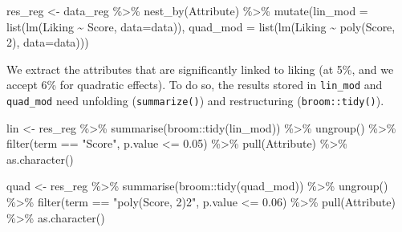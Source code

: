 \documentclass[
]{krantz}
\makeatletter
\newenvironment{Shaded}{\begin{snugshade}}{\end{snugshade}}
\newcommand{\AttributeTok}[1]{\textcolor[rgb]{0.61,0.61,0.61}{#1}}
\newcommand{\DecValTok}[1]{\textcolor[rgb]{0.06,0.06,0.06}{#1}}
\newcommand{\FloatTok}[1]{\textcolor[rgb]{0.06,0.06,0.06}{#1}}
\newcommand{\FunctionTok}[1]{\textcolor[rgb]{0,0,0}{#1}}
\newcommand{\NormalTok}[1]{#1}
\newcommand{\OtherTok}[1]{\textcolor[rgb]{0.37,0.37,0.37}{#1}}
\newcommand{\SpecialCharTok}[1]{\textcolor[rgb]{0,0,0}{#1}}
\newcommand{\StringTok}[1]{\textcolor[rgb]{0.5,0.5,0.5}{#1}}
\newenvironment{kframe}{%
\medskip{}
\setlength{\fboxsep}{.8em}
 \def\at@end@of@kframe{}%
 \ifinner\ifhmode%
  \def\at@end@of@kframe{\end{minipage}}%
  \begin{minipage}{\columnwidth}%
 \fi\fi%
 \def\FrameCommand##1{\hskip\@totalleftmargin \hskip-\fboxsep
 \colorbox{shadecolor}{##1}\hskip-\fboxsep
     \hskip-\linewidth \hskip-\@totalleftmargin \hskip\columnwidth}%
 \MakeFramed {\advance\hsize-\width
   \@totalleftmargin\z@ \linewidth\hsize
   \@setminipage}}%
 {\par\unskip\endMakeFramed%
 \at@end@of@kframe}
\renewenvironment{Shaded}{\begin{kframe}}{\end{kframe}}
\makeatother
\begin{document}
\begin{Shaded}
\begin{Highlighting}[]
\NormalTok{res\_reg }\OtherTok{\textless{}{-}}\NormalTok{ data\_reg }\SpecialCharTok{\%\textgreater{}\%}
  \FunctionTok{nest\_by}\NormalTok{(Attribute) }\SpecialCharTok{\%\textgreater{}\%}
  \FunctionTok{mutate}\NormalTok{(}\AttributeTok{lin\_mod =} \FunctionTok{list}\NormalTok{(}\FunctionTok{lm}\NormalTok{(Liking }\SpecialCharTok{\textasciitilde{}}\NormalTok{ Score, }\AttributeTok{data=}\NormalTok{data)),}
         \AttributeTok{quad\_mod =} \FunctionTok{list}\NormalTok{(}\FunctionTok{lm}\NormalTok{(Liking }\SpecialCharTok{\textasciitilde{}} \FunctionTok{poly}\NormalTok{(Score, }\DecValTok{2}\NormalTok{), }\AttributeTok{data=}\NormalTok{data)))}
\end{Highlighting}
\end{Shaded}

We extract the attributes that are significantly linked to liking (at 5\%, and we accept 6\% for quadratic effects). To do so, the results stored in \texttt{lin\_mod} and \texttt{quad\_mod} need unfolding (\texttt{summarize()}) and restructuring (\texttt{broom::tidy()}).

\begin{Shaded}
\begin{Highlighting}[]
\NormalTok{lin }\OtherTok{\textless{}{-}}\NormalTok{ res\_reg }\SpecialCharTok{\%\textgreater{}\%}
  \FunctionTok{summarise}\NormalTok{(broom}\SpecialCharTok{::}\FunctionTok{tidy}\NormalTok{(lin\_mod)) }\SpecialCharTok{\%\textgreater{}\%}
  \FunctionTok{ungroup}\NormalTok{() }\SpecialCharTok{\%\textgreater{}\%}
  \FunctionTok{filter}\NormalTok{(term }\SpecialCharTok{==} \StringTok{"Score"}\NormalTok{, p.value }\SpecialCharTok{\textless{}=} \FloatTok{0.05}\NormalTok{) }\SpecialCharTok{\%\textgreater{}\%}
  \FunctionTok{pull}\NormalTok{(Attribute) }\SpecialCharTok{\%\textgreater{}\%}
  \FunctionTok{as.character}\NormalTok{()}

\NormalTok{quad }\OtherTok{\textless{}{-}}\NormalTok{ res\_reg }\SpecialCharTok{\%\textgreater{}\%}
  \FunctionTok{summarise}\NormalTok{(broom}\SpecialCharTok{::}\FunctionTok{tidy}\NormalTok{(quad\_mod)) }\SpecialCharTok{\%\textgreater{}\%}
  \FunctionTok{ungroup}\NormalTok{() }\SpecialCharTok{\%\textgreater{}\%}
  \FunctionTok{filter}\NormalTok{(term }\SpecialCharTok{==} \StringTok{"poly(Score, 2)2"}\NormalTok{, p.value }\SpecialCharTok{\textless{}=} \FloatTok{0.06}\NormalTok{) }\SpecialCharTok{\%\textgreater{}\%}
  \FunctionTok{pull}\NormalTok{(Attribute) }\SpecialCharTok{\%\textgreater{}\%}
  \FunctionTok{as.character}\NormalTok{()}
\end{Highlighting}
\end{Shaded}
\end{document}
